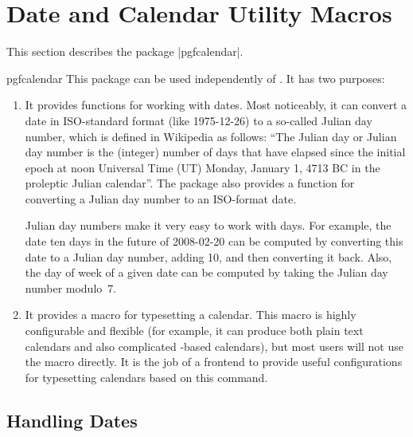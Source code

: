 %
%
%


\section{Date and Calendar Utility Macros}
\label{section-calendar}

This section describes the package |pgfcalendar|.

\begin{package}{pgfcalendar}
    This package can be used independently of \pgfname. It has two purposes:
    \begin{enumerate}
        \item It provides functions for working with dates. Most noticeably, it
            can convert a date in ISO-standard format (like 1975-12-26) to a
            so-called Julian day number, which is defined in Wikipedia as
            follows: ``The Julian day or Julian day number is the (integer)
            number of days that have elapsed since the initial epoch at noon
            Universal Time (UT) Monday, January 1, 4713 BC in the proleptic
            Julian calendar''. The package also provides a function for
            converting a Julian day number to an ISO-format date.

            Julian day numbers make it very easy to work with days. For
            example, the date ten days in the future of 2008-02-20 can be
            computed by converting this date to a Julian day number, adding 10,
            and then converting it back. Also, the day of week of a given date
            can be computed by taking the Julian day number modulo~7.
        \item It provides a macro for typesetting a calendar. This macro is
            highly configurable and flexible (for example, it can produce both
            plain text calendars and also complicated \tikzname-based
            calendars), but most users will not use the macro directly. It is
            the job of a frontend to provide useful configurations for
            typesetting calendars based on this command.
    \end{enumerate}
\end{package}


\subsection{Handling Dates}

